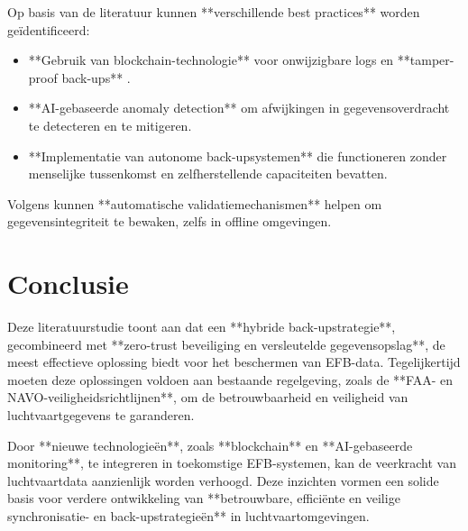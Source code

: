 \documentclass{hogent-article}
\begin{document}
        Op basis van de literatuur kunnen **verschillende best practices** worden geïdentificeerd:
        
        \begin{itemize}
            \item **Gebruik van blockchain-technologie** voor onwijzigbare logs en **tamper-proof back-ups** \autocite{VinayakBhuvi}.
            \item **AI-gebaseerde anomaly detection** om afwijkingen in gegevensoverdracht te detecteren en te mitigeren.
            \item **Implementatie van autonome back-upsystemen** die functioneren zonder menselijke tussenkomst en zelfherstellende capaciteiten bevatten.
        \end{itemize}
        
        Volgens \textcite{Abdelaziz48PP100_116} kunnen **automatische validatiemechanismen** helpen om gegevensintegriteit te bewaken, zelfs in offline omgevingen.
        
        \section{Conclusie}
        
        Deze literatuurstudie toont aan dat een **hybride back-upstrategie**, gecombineerd met **zero-trust beveiliging en versleutelde gegevensopslag**, de meest effectieve oplossing biedt voor het beschermen van EFB-data. Tegelijkertijd moeten deze oplossingen voldoen aan bestaande regelgeving, zoals de **FAA- en NAVO-veiligheidsrichtlijnen**, om de betrouwbaarheid en veiligheid van luchtvaartgegevens te garanderen.
        
        Door **nieuwe technologieën**, zoals **blockchain** en **AI-gebaseerde monitoring**, te integreren in toekomstige EFB-systemen, kan de veerkracht van luchtvaartdata aanzienlijk worden verhoogd. Deze inzichten vormen een solide basis voor verdere ontwikkeling van **betrouwbare, efficiënte en veilige synchronisatie- en back-upstrategieën** in luchtvaartomgevingen.
        
        \printbibliography
        
    
\end{document}

